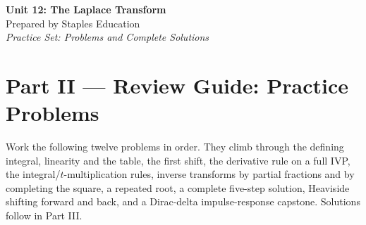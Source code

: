 




\begin{center}
    {\LARGE \bfseries Unit 12: The Laplace Transform}\\[6pt]
    {\large Prepared by Staples Education}\\[4pt]
    {\itshape Practice Set: Problems and Complete Solutions}
\end{center}

\vspace{0.4em}

{}
\section*{Part II --- Review Guide: Practice Problems}

Work the following twelve problems in order. They climb through the defining integral,
linearity and the table, the first shift, the derivative rule on a full IVP, the
integral/$t$-multiplication rules, inverse transforms by partial fractions and by
completing the square, a repeated root, a complete five-step solution, Heaviside
shifting forward and back, and a Dirac-delta impulse-response capstone. Solutions
follow in Part III.

